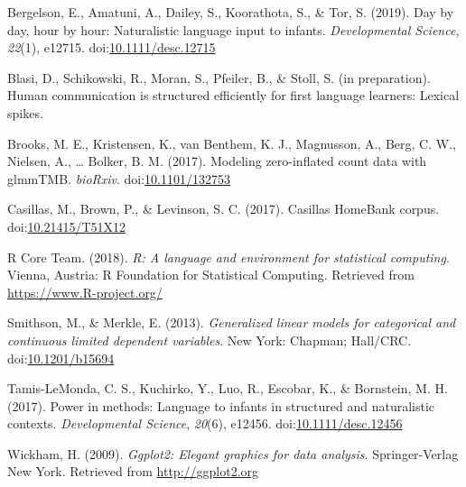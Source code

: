 \documentclass[,man,floatsintext]{apa6}
\begin{document}
\hypertarget{ref-bergelson2019day}{}
Bergelson, E., Amatuni, A., Dailey, S., Koorathota, S., \& Tor, S.
(2019). Day by day, hour by hour: Naturalistic language input to
infants. \emph{Developmental Science}, \emph{22}(1), e12715.
doi:\href{https://doi.org/10.1111/desc.12715}{10.1111/desc.12715}

\hypertarget{ref-blasiIPhuman}{}
Blasi, D., Schikowski, R., Moran, S., Pfeiler, B., \& Stoll, S. (in
preparation). Human communication is structured efficiently for first
language learners: Lexical spikes.

\hypertarget{ref-brooks2017modeling}{}
Brooks, M. E., Kristensen, K., van Benthem, K. J., Magnusson, A., Berg,
C. W., Nielsen, A., \ldots{} Bolker, B. M. (2017). Modeling
zero-inflated count data with glmmTMB. \emph{bioRxiv}.
doi:\href{https://doi.org/10.1101/132753}{10.1101/132753}

\hypertarget{ref-Casillas-HB}{}
Casillas, M., Brown, P., \& Levinson, S. C. (2017). Casillas HomeBank
corpus. doi:\href{https://doi.org/10.21415/T51X12}{10.21415/T51X12}

\hypertarget{ref-R-base}{}
R Core Team. (2018). \emph{R: A language and environment for statistical
computing}. Vienna, Austria: R Foundation for Statistical Computing.
Retrieved from \url{https://www.R-project.org/}

\hypertarget{ref-smithson2013generalized}{}
Smithson, M., \& Merkle, E. (2013). \emph{Generalized linear models for
categorical and continuous limited dependent variables}. New York:
Chapman; Hall/CRC.
doi:\href{https://doi.org/10.1201/b15694}{10.1201/b15694}

\hypertarget{ref-tamislemonda2017power}{}
Tamis-LeMonda, C. S., Kuchirko, Y., Luo, R., Escobar, K., \& Bornstein,
M. H. (2017). Power in methods: Language to infants in structured and
naturalistic contexts. \emph{Developmental Science}, \emph{20}(6),
e12456.
doi:\href{https://doi.org/10.1111/desc.12456}{10.1111/desc.12456}

\hypertarget{ref-R-ggplot2}{}
Wickham, H. (2009). \emph{Ggplot2: Elegant graphics for data analysis}.
Springer-Verlag New York. Retrieved from \url{http://ggplot2.org}

\endgroup
\end{document}
